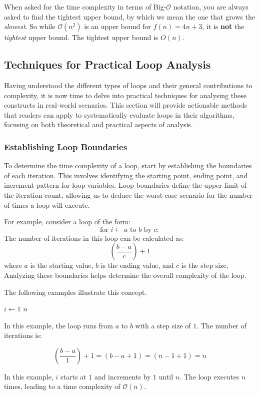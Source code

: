 When asked for the time complexity in terms of Big-$\mathcal{O}$ notation, you are always asked to find the tightest upper bound, by which we mean the one that grows the \textit{slowest}. So while $\mathcal{O}(n^2)$ is an upper bound for $f(n) = 4n+3$, it is \textbf{not} the \textit{tightest} upper bound. The tightest upper bound is $O(n)$.

\subsection*{Techniques for Practical Loop Analysis}

Having understood the different types of loops and their general contributions to complexity, it is now time to delve into practical techniques for analysing these constructs in real-world scenarios. This section will provide actionable methods that readers can apply to systematically evaluate loops in their algorithms, focusing on both theoretical and practical aspects of analysis.

\subsubsection*{Establishing Loop Boundaries}
To determine the time complexity of a loop, start by establishing the boundaries of each iteration. This involves identifying the starting point, ending point, and increment pattern for loop variables. Loop boundaries define the upper limit of the iteration count, allowing us to deduce the worst-case scenario for the number of times a loop will execute.

For example, consider a loop of the form:
\[ 
\text{for } i \gets a \text{ to } b \text{ by } c:
\]
The number of iterations in this loop can be calculated as:
\[
\left(\frac{b - a}{c}\right) + 1
\]
where $a$ is the starting value, $b$ is the ending value, and $c$ is the step size. Analyzing these boundaries helps determine the overall complexity of the loop.

The following examples illustrate this concept.

\begin{example}

    \begin{codebox}
        \li \For $i \gets 1$ \To $n$ \Do
        \li     {}
            \End
    \end{codebox}

In this example, the loop runs from $a$ to $b$ with a step size of $1$. The number of iterations is:

\[
\left( \frac{b - a}{1} \right) + 1 = (b - a + 1) = (n - 1 + 1) = n 
\]

In this example, $i$ starts at $1$ and increments by $1$ until $n$. The loop executes $n$ times, leading to a time complexity of $\mathcal{O}(n)$.

\end{example}

